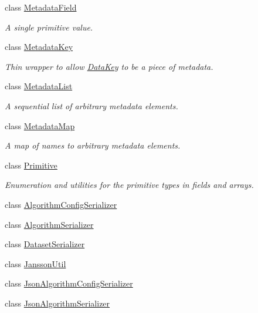 \begin{DoxyCompactItemize}
class \hyperlink{classBUSBOY_1_1MetadataField}{MetadataField}
\begin{DoxyCompactList}\small\item\em A single primitive value. \item\end{DoxyCompactList}\item 
class \hyperlink{classBUSBOY_1_1MetadataKey}{MetadataKey}
\begin{DoxyCompactList}\small\item\em Thin wrapper to allow \hyperlink{classBUSBOY_1_1DataKey}{DataKey} to be a piece of metadata. \item\end{DoxyCompactList}\item 
class \hyperlink{classBUSBOY_1_1MetadataList}{MetadataList}
\begin{DoxyCompactList}\small\item\em A sequential list of arbitrary metadata elements. \item\end{DoxyCompactList}\item 
class \hyperlink{classBUSBOY_1_1MetadataMap}{MetadataMap}
\begin{DoxyCompactList}\small\item\em A map of names to arbitrary metadata elements. \item\end{DoxyCompactList}\item 
class \hyperlink{classBUSBOY_1_1Primitive}{Primitive}
\begin{DoxyCompactList}\small\item\em Enumeration and utilities for the primitive types in fields and arrays. \item\end{DoxyCompactList}\item 
class \hyperlink{classBUSBOY_1_1AlgorithmConfigSerializer}{AlgorithmConfigSerializer}
\item 
class \hyperlink{classBUSBOY_1_1AlgorithmSerializer}{AlgorithmSerializer}
\item 
class \hyperlink{classBUSBOY_1_1DatasetSerializer}{DatasetSerializer}
\item 
class \hyperlink{classBUSBOY_1_1JanssonUtil}{JanssonUtil}
\item 
class \hyperlink{classBUSBOY_1_1JsonAlgorithmConfigSerializer}{JsonAlgorithmConfigSerializer}
\item 
class \hyperlink{classBUSBOY_1_1JsonAlgorithmSerializer}{JsonAlgorithmSerializer}

\end{DoxyCompactItemize}
